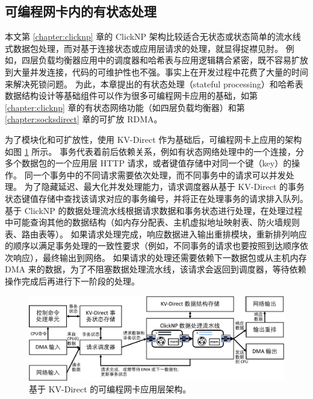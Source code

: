 \subsection{可编程网卡内的有状态处理}

本文第 \ref{chapter:clicknp} 章的 ClickNP 架构比较适合无状态或状态简单的流水线式数据包处理，而对基于连接状态或应用层请求的处理，就显得捉襟见肘。
例如，四层负载均衡器应用中的调度器和哈希表与应用逻辑耦合紧密，既不容易扩放到大量并发连接，代码的可维护性也不强。事实上在开发过程中花费了大量的时间来解决死锁问题。
为此，本章提出的有状态处理（stateful processing）和哈希表数据结构设计等基础组件可以作为很多可编程网卡应用的基础，如第 \ref{chapter:clicknp} 章的有状态网络功能（如四层负载均衡器）和第 \ref{chapter:socksdirect} 章的可扩放 RDMA。

为了模块化和可扩放性，使用 KV-Direct 作为基础后，可编程网卡上应用的架构如图 \ref{arch:fig:kvdirect_arch} 所示。
事务代表着前后依赖关系，例如有状态网络处理中的一个连接，分多个数据包的一个应用层 HTTP 请求，或者键值存储中对同一个键（key）的操作。
同一个事务中的不同请求需要依次处理，而不同事务中的请求可以并发处理。
为了隐藏延迟、最大化并发处理能力，请求调度器从基于 KV-Direct 的事务状态键值存储中查找该请求对应的事务编号，并将正在处理事务的请求排入队列。
基于 ClickNP 的数据处理流水线根据请求数据和事务状态进行处理，在处理过程中可能查询其他的数据结构（如内存分配表、主机虚拟地址映射表、防火墙规则表、路由表等）。
如果请求处理完成，响应数据进入输出重排模块，重新排列响应的顺序以满足事务处理的一致性要求（例如，不同事务的请求也要按照到达顺序依次响应），最终输出到网络。
如果请求的处理还需要依赖下一数据包或从主机内存 DMA 来的数据，为了不阻塞数据处理流水线，该请求会返回到调度器，等待依赖操作完成后再进行下一阶段的处理。


\begin{figure}[htbp]
	\centering
	\includegraphics[width=1.0\textwidth]{figures/kvdirect_arch.pdf}
	\caption{基于 KV-Direct 的可编程网卡应用层架构。}
	\label{arch:fig:kvdirect_arch}
\end{figure}